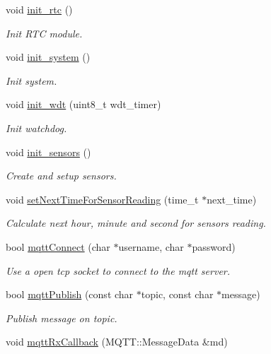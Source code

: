 \begin{DoxyCompactItemize}
void \hyperlink{rmap_8ino_ab985cc69f5f573113405b4f118c96d33}{init\+\_\+rtc} ()
\begin{DoxyCompactList}\small\item\em Init R\+TC module. \end{DoxyCompactList}\item 
void \hyperlink{rmap_8ino_afceb890a6ab9be73cc5481369538c705}{init\+\_\+system} ()
\begin{DoxyCompactList}\small\item\em Init system. \end{DoxyCompactList}\item 
void \hyperlink{rmap_8ino_a980e73df66b14b1190bc25da430a4f12}{init\+\_\+wdt} (uint8\+\_\+t wdt\+\_\+timer)
\begin{DoxyCompactList}\small\item\em Init watchdog. \end{DoxyCompactList}\item 
void \hyperlink{rmap_8ino_ac74850003fab6eb3269bfe043d0f939c}{init\+\_\+sensors} ()
\begin{DoxyCompactList}\small\item\em Create and setup sensors. \end{DoxyCompactList}\item 
void \hyperlink{rmap_8ino_a1686e2719fa4a37ef933458673973d28}{set\+Next\+Time\+For\+Sensor\+Reading} (time\+\_\+t $\ast$next\+\_\+time)
\begin{DoxyCompactList}\small\item\em Calculate next hour, minute and second for sensors reading. \end{DoxyCompactList}\item 
bool \hyperlink{rmap_8ino_a9f5e5ca8c47d4536dd1805e89fbb7db2}{mqtt\+Connect} (char $\ast$username, char $\ast$password)
\begin{DoxyCompactList}\small\item\em Use a open tcp socket to connect to the mqtt server. \end{DoxyCompactList}\item 
bool \hyperlink{rmap_8ino_aa0d50218413a12917f8c70ef4e1e1e72}{mqtt\+Publish} (const char $\ast$topic, const char $\ast$message)
\begin{DoxyCompactList}\small\item\em Publish message on topic. \end{DoxyCompactList}\item 
void \hyperlink{rmap_8ino_a4fe2f970295d296f7f6725fe9e946933}{mqtt\+Rx\+Callback} (M\+Q\+T\+T\+::\+Message\+Data \&md)

\end{DoxyCompactItemize}
